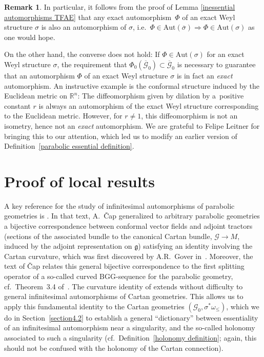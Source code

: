 \documentclass[11pt]{article}
\def\R{\mathbb{R}}
\def\g{\mathfrak{g}}
\def\Gbdle{\mathcal{G}}
\theoremstyle{plain}
\theoremstyle{definition}
\newtheorem{Remark}[Definition]{Remark}
\begin{document}
\begin{Remark} In particular, it follows from the proof of Lemma \ref{inessential automorphisms TFAE} that any exact automor\-phism~$\Phi$ of an exact Weyl structure $\sigma$ is also an automorphism of $\sigma$, i.e.\ $\Phi \in \mathrm{Aut}(\overline{\sigma}) \Rightarrow \Phi \in \mathrm{Aut}(\sigma)$ as one would hope.

 On the other hand, the converse does not hold: If $\Phi \in \mathrm{Aut}(\sigma)$ for an exact Weyl structure $\sigma$, the requirement that $\Phi_0(\overline{\Gbdle}_0) \subset \overline{\Gbdle}_0$ is necessary to guarantee that an automorphism $\Phi$ of an exact Weyl structure $\sigma$ is in fact an \emph{exact} automorphism. An instructive example is the conformal structure induced by the Euclidean metric on $\R^n$: The dif\/feomorphism given by dilation by a~positive constant $r$ is always an automorphism of the exact Weyl structure corresponding to the Euclidean metric. However, for $r \neq 1$, this dif\/feomorphism is not an isometry, hence not an \emph{exact} automorphism. We are grateful to Felipe Leitner for bringing this to our attention, which led us to modify an earlier version of Def\/inition~\ref{parabolic essential definition}.
\end{Remark}
\setcounter{section}{3}
\setcounter{subsection}{0}
\setcounter{subsubsection}{0}
\setcounter{Theorem}{2}
\setcounter{equation}{5}
\section{Proof of local results}\label{section4}

A key reference for the study of inf\/initesimal automorphisms of parabolic geometries is \cite{Cap inf aut}. In that text, A.~\v{C}ap generalized to arbitrary parabolic geometries a bijective correspondence between conformal vector f\/ields and adjoint tractors (sections of the associated bundle to the canonical Cartan bundle, $\Gbdle \rightarrow M$, induced by the adjoint representation on $\g$) satisfying an identity involving the Cartan curvature, which was f\/irst discovered by A.R.~Gover in~\cite{Gover}. Moreover, the text of \v{C}ap relates this general bijective correspondence to the f\/irst splitting operator of a so-called curved BGG-sequence for the parabolic geometry, cf.\ Theorem~3.4 of~\cite{Cap inf aut}. The curvature identity of \cite{Cap inf aut} extends without dif\/f\/iculty to general inf\/initesimal automorphisms of Cartan geometries. This allows us to apply this fundamental identity to the Cartan geometries $(\Gbdle_0,\sigma^*\omega_{\leq})$, which we do in Section~\ref{section4.2} to establish a general ``dictionary'' between essentiality of an inf\/initesimal automorphism near a singularity, and the so-called holonomy associated to such a singularity (cf.\ Def\/inition~\ref{holonomy definition}; again, this should not be confused with the holonomy of the Cartan connection).
\end{document}
